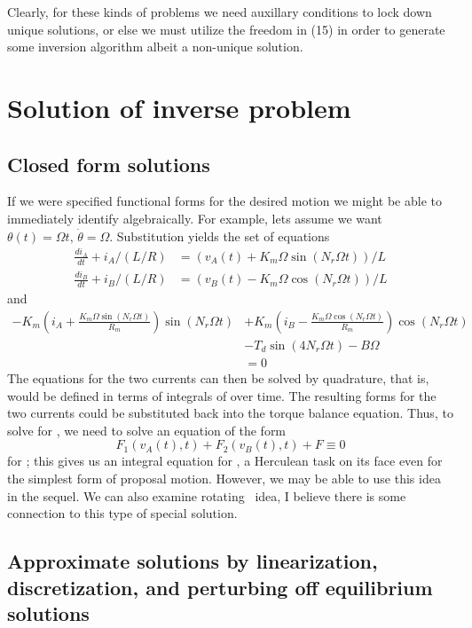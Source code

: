 \documentclass{article}
\begin{document}
\begin{appendix}
Clearly, for these kinds of problems we need auxillary conditions to lock down unique solutions, or else we must utilize the freedom in (15) in order to generate some inversion algorithm albeit a non-unique solution. 

\section{Solution of inverse problem}
\subsection{Closed form solutions}
If we were specified functional forms for the desired motion we might be able to immediately identify \vsol algebraically. For example, lets assume we want $\theta(t)= \Omega t,\, \dot\theta=\Omega$. Substitution yields the set of equations
\begin{align}
\frac{di_A}{dt} + i_A / (L/R) &= (v_A(t) + K_m \Omega \sin(N_r\Omega t) ) / L\\
\frac{di_B}{dt} + i_B / (L/R) &= (v_B(t) - K_m \Omega \cos(N_r\Omega t) ) / L
\end{align}
and 
\begin{equation}
\begin{split}
- K_m \left(i_A + \frac{K_m \Omega \sin(N_r\Omega t)}{R_m}\right)\sin(N_r\Omega t) 
	 		&+ K_m \left(i_B - \frac{K_m \Omega \cos(N_r\Omega t)}{R_m}\right) \cos(N_r\Omega t)\\
	 		&- T_d\sin(4N_r\Omega t) - B \Omega\\ & = 0
\end{split}	 		
\end{equation}	
The equations for the two currents can then be solved by quadrature, that is, \isol would be defined in terms of integrals of \vsol over time. The resulting forms for the two currents could be substituted back into the torque balance equation. Thus, to solve for \vsol, we need to solve an equation of the form \begin{equation}
F_1(v_A(t), t) + F_2(v_B(t), t) + F \equiv 0
\end{equation}
for \vsol; this gives us an integral equation for \vsol, a  Herculean task on its face even for the simplest form of proposal motion. However, we may be able to use this idea in the sequel. We can also examine rotating \vsol\ idea, I believe there is some connection to this type of special solution.  

\subsection{Approximate solutions by linearization, discretization, and perturbing off equilibrium solutions}

\end{appendix}
\end{document}
